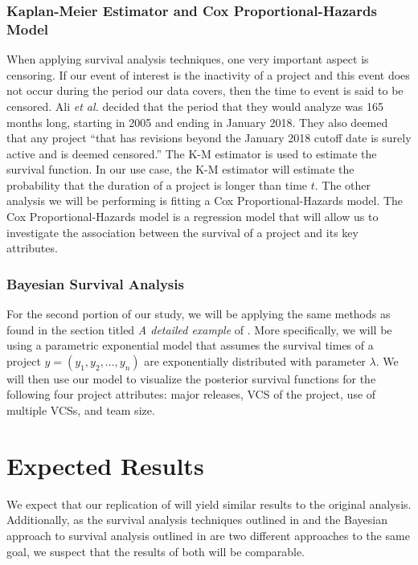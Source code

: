 \documentclass[conference]{IEEEtran}
\begin{document}
\subsubsection{Kaplan-Meier Estimator and Cox Proportional-Hazards Model}

When applying survival analysis techniques, one very important aspect is censoring. If our event of interest is the inactivity of a project and this event does not occur during the period our data covers, then the time to event is said to be censored. Ali \emph{et al.} decided that the period that they would analyze was 165 months long, starting in 2005 and ending in January 2018. They also deemed that any project ``that has revisions beyond the January 2018 cutoff date is surely active and is deemed censored.'' \cite{ali2020cheating} The K-M estimator is used to estimate the survival function. In our use case, the K-M estimator will estimate the probability that the duration of a project is longer than time $t$. The other analysis we will be performing is fitting a Cox Proportional-Hazards model. The Cox Proportional-Hazards model is a regression model that will allow us to investigate the association between the survival of a project and its key attributes.

\subsubsection{Bayesian Survival Analysis}

For the second portion of our study, we will be applying the same methods as found in the section titled \emph{A detailed example} of \cite{kelter2020bayesian}. More specifically, we will be using a parametric exponential model that assumes the survival times of a project $y = (y_1, y_2, \dots, y_n)$ are exponentially distributed with parameter $\lambda$. We will then use our model to visualize the posterior survival functions for the following four project attributes: major releases, VCS of the project, use of multiple VCSs, and team size.

\section{Expected Results}

We expect that our replication of \cite{ali2020cheating} will yield similar results to the original analysis. Additionally, as the survival analysis techniques outlined in \cite{ali2020cheating} and the Bayesian approach to survival analysis outlined in \cite{kelter2020bayesian} are two different approaches to the same goal, we suspect that the results of both will be comparable.
\end{document}
